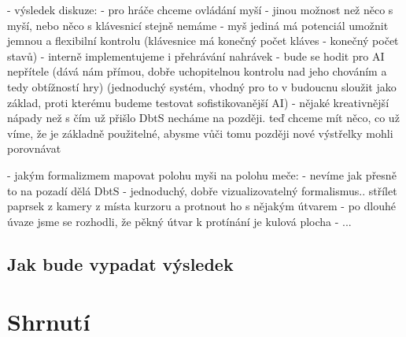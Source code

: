 - výsledek diskuze: 
    - pro hráče chceme ovládání myší
        - jinou možnost než něco s myší, nebo něco s klávesnicí stejně nemáme
        - myš jediná má potenciál umožnit jemnou a flexibilní kontrolu (klávesnice má konečný počet kláves - konečný počet stavů)
    - interně implementujeme i přehrávání nahrávek - bude se hodit pro AI nepřítele (dává nám přímou, dobře uchopitelnou kontrolu nad jeho chováním a tedy obtížností hry) (jednoduchý systém, vhodný pro to v budoucnu sloužit jako základ, proti kterému budeme testovat sofistikovanější AI)
    - nějaké kreativnější nápady než s čím už přišlo DbtS necháme na později. teď chceme mít něco, co už víme, že je základně použitelné, abysme vůči tomu později nové výstřelky mohli porovnávat

- jakým formalizmem mapovat polohu myši na polohu meče:
    - nevíme jak přesně to na pozadí dělá DbtS
    - jednoduchý, dobře vizualizovatelný formalismus.. střílet paprsek z kamery z místa kurzoru a protnout ho s nějakým útvarem 
    - po dlouhé úvaze jsme se rozhodli, že pěkný útvar k protínání je kulová plocha
    - ...

\subsection{Jak bude vypadat výsledek}


\section{Shrnutí}
